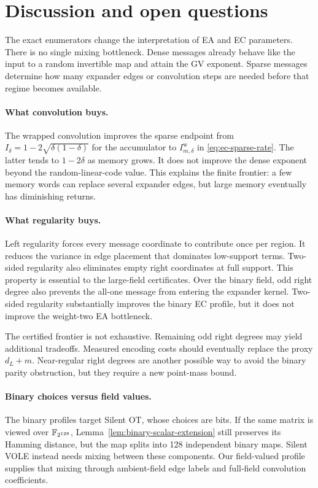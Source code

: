 \section{Discussion and open questions}
\label{sec:discussion}

The exact enumerators change the interpretation of EA and EC parameters.
There is no single mixing bottleneck.  Dense messages already behave like the
input to a random invertible map and attain the GV exponent.  Sparse messages
determine how many expander edges or convolution steps are needed before that
regime becomes available.

\paragraph{What convolution buys.}
The wrapped convolution improves the sparse endpoint from
$I_\delta=1-2\sqrt{\delta(1-\delta)}$ for the accumulator to
$I^{\mathrm w}_{m,\delta}$ in \eqref{eq:ec-sparse-rate}.  The latter tends to
$1-2\delta$ as memory grows.  It does not improve the dense exponent beyond
the random-linear-code value.  This explains the finite frontier: a few
memory words can replace several expander edges, but large memory eventually
has diminishing returns.

\paragraph{What regularity buys.}
Left regularity forces every message coordinate to contribute once per
region.  It reduces the variance in edge placement that dominates low-support
terms.  Two-sided regularity also eliminates empty right coordinates at full
support.  This property is essential to the large-field certificates.  Over
the binary field, odd right degree also prevents the all-one message from
entering the expander kernel.  Two-sided regularity substantially improves
the binary EC profile, but it does not improve the weight-two EA bottleneck.

The certified frontier is not exhaustive.  Remaining odd right degrees may
yield additional tradeoffs.  Measured encoding costs should eventually
replace the proxy $d_L+m$.  Near-regular right degrees are another possible
way to avoid the binary parity obstruction, but they require a new point-mass
bound.

\paragraph{Binary choices versus field values.}
The binary profiles target Silent OT, whose choices are bits.  If the same
matrix is viewed over $\mathbb F_{2^{128}}$, Lemma~\ref{lem:binary-scalar-extension}
still preserves its Hamming distance, but the map splits into 128 independent
binary maps.  Silent VOLE instead needs mixing between these components.  Our
field-valued profile supplies that mixing through ambient-field edge labels
and full-field convolution coefficients.

